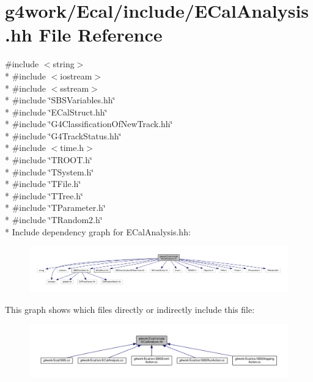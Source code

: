 \hypertarget{_e_cal_analysis_8hh}{\section{g4work/\-Ecal/include/\-E\-Cal\-Analysis.hh File Reference}
\label{_e_cal_analysis_8hh}
}
{\ttfamily \#include $<$string$>$}\\*
{\ttfamily \#include $<$iostream$>$}\\*
{\ttfamily \#include $<$sstream$>$}\\*
{\ttfamily \#include \char`\"{}S\-B\-S\-Variables.\-hh\char`\"{}}\\*
{\ttfamily \#include \char`\"{}E\-Cal\-Struct.\-hh\char`\"{}}\\*
{\ttfamily \#include \char`\"{}G4\-Classification\-Of\-New\-Track.\-hh\char`\"{}}\\*
{\ttfamily \#include \char`\"{}G4\-Track\-Status.\-hh\char`\"{}}\\*
{\ttfamily \#include $<$time.\-h$>$}\\*
{\ttfamily \#include \char`\"{}T\-R\-O\-O\-T.\-h\char`\"{}}\\*
{\ttfamily \#include \char`\"{}T\-System.\-h\char`\"{}}\\*
{\ttfamily \#include \char`\"{}T\-File.\-h\char`\"{}}\\*
{\ttfamily \#include \char`\"{}T\-Tree.\-h\char`\"{}}\\*
{\ttfamily \#include \char`\"{}T\-Parameter.\-h\char`\"{}}\\*
{\ttfamily \#include \char`\"{}T\-Random2.\-h\char`\"{}}\\*
Include dependency graph for E\-Cal\-Analysis.\-hh\-:\nopagebreak
\begin{figure}[H]
\begin{center}
\leavevmode
\includegraphics[width=350pt]{_e_cal_analysis_8hh__incl}
\end{center}
\end{figure}
This graph shows which files directly or indirectly include this file\-:\nopagebreak
\begin{figure}[H]
\begin{center}
\leavevmode
\includegraphics[width=350pt]{_e_cal_analysis_8hh__dep__incl}
\end{center}
\end{figure}
